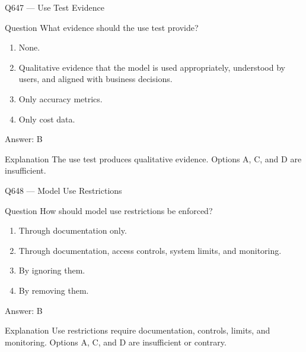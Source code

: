 \documentclass[aspectratio=169,8pt]{beamer}
\begin{document}
	\begin{frame}{Q647 --- Use Test Evidence}
		\begin{block}{Question}
			What evidence should the use test provide?
			\begin{enumerate}
				\item None.
				\item Qualitative evidence that the model is used appropriately, understood by users, and aligned with business decisions.
				\item Only accuracy metrics.
				\item Only cost data.
			\end{enumerate}
		\end{block}
		\begin{exampleblock}{Answer: B}\end{exampleblock}
		\begin{block}{Explanation}
			The use test produces qualitative evidence. Options A, C, and D are insufficient.
		\end{block}
	\end{frame}
	
	\begin{frame}{Q648 --- Model Use Restrictions}
		\begin{block}{Question}
			How should model use restrictions be enforced?
			\begin{enumerate}
				\item Through documentation only.
				\item Through documentation, access controls, system limits, and monitoring.
				\item By ignoring them.
				\item By removing them.
			\end{enumerate}
		\end{block}
		\begin{exampleblock}{Answer: B}\end{exampleblock}
		\begin{block}{Explanation}
			Use restrictions require documentation, controls, limits, and monitoring. Options A, C, and D are insufficient or contrary.
		\end{block}
	\end{frame}
	
\end{document}

